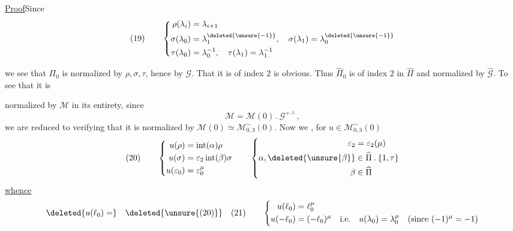 \uline{Proof}\quad Since
\[
(19)\qquad
\left\{\begin{aligned}
\rho(\lambda_i)&=\lambda_{i+1}\\
\sigma(\lambda_0)&=\lambda_{1}^{\deleted{\unsure{-1}}},\quad
\sigma(\lambda_1)=\lambda_0^{\deleted{\unsure{-1}}}\\
\tau(\lambda_0)&=\lambda_0^{-1},\quad\tau(\lambda_1)=\lambda_1^{-1}
\end{aligned}\right.
\]

we see that $\Pi_0$ is  normalized by $\rho,\sigma,\tau$, hence by $\mathcal G$. That it is of index $2$ is obvious. Thus $\widehat\Pi_0$ is of index $2$ in $\widehat\Pi$ and normalized by $\widehat{\mathcal G}$. To see that it is



normalized by $\mathcal M$ in its  entirety, since
\[
\mathcal M=\mathcal M(0)\mathbin{.}\mathcal G^{+\wedge},
\]
we are reduced to verifying that it is normalized by
$\mathcal M(0)\simeq\mathcal M_{0,3}^{\sim}(0)$.
Now we , for $u\in\mathcal M_{0,3}^{\sim}(0)$
\[
(20)\qquad
\left\{
\begin{aligned}
u(\rho)&=\operatorname{int}(\alpha)\rho\\
u(\sigma)&=\varepsilon_2\operatorname{int}(\beta)\sigma\\
u(\varepsilon_0)&=\varepsilon_0^\mu
\end{aligned}
\right.
\qquad
\left\{
\begin{aligned}
\varepsilon_2&=\varepsilon_2(\mu)\\
\alpha,\deleted{\unsure{\beta}}&\in\widehat{\Pi}\mathbin{.}\{1,\tau\}\\
\beta&\in\widehat{\Pi}
\end{aligned}
\right.
\]
\uline{whence}
\[
\deleted{u(\ell_0)=}\quad
\deleted{\unsure{(20)}}\quad
(21)\qquad
\left\{
\begin{aligned}
u(\ell_0)&=\ell_0^\mu\\
u(-\ell_0)&=(-\ell_0)^\mu
\quad\text{i.e.}\quad
u(\lambda_0)=\lambda_0^\mu
\quad(\text{since }(-1)^\mu=-1)
\end{aligned}
\right.
\]
\margin{$\unsure{)}$}

